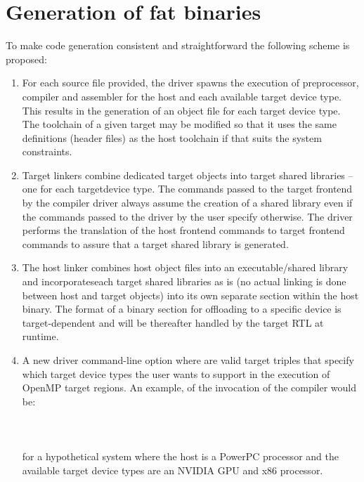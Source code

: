 \section{Generation of fat binaries}

To make code generation consistent and straightforward the following scheme is proposed: 
\begin{enumerate}
  \item For each source file provided, the driver spawns the execution of preprocessor, compiler and assembler for the host and each available target device type. This results in the generation of an object file for each target device type. The toolchain of a given target may be modified so that it uses the same definitions (header files) as the host toolchain if that suits the system constraints.

  \item Target linkers combine dedicated target objects into target shared libraries – one for each targetdevice type. The commands passed to the target frontend by the compiler driver always assume the creation of a shared library even if the commands passed to the driver by the user specify otherwise. The driver performs the translation of the host frontend commands to target frontend commands to assure that a target shared library is generated.

  \item The host linker combines host object files into an executable/shared library and incorporateseach target shared libraries as is (no actual linking is done between host and target objects) into its own separate section within the host binary. The format of a binary section for offloading to a specific device is target-dependent and will be thereafter handled by the target RTL at runtime.

  \item A new driver command-line option  where  are valid target triples that specify which target device types the user wants to support in the execution of OpenMP target regions. An example, of the invocation of the compiler would be:
  \\ ~ \\
  \\ ~ \\
  for a hypothetical system where the host is a PowerPC processor and the available target device types are an NVIDIA GPU and x86 processor.


\end{enumerate}
